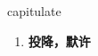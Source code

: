 
\begin{frame}
{\huge capitulate}
\begin{center}
\begin{enumerate}\Large
  \item \textbf{投降，默许}
\end{enumerate}
\end{center}
\end{frame}
